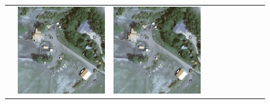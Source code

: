 \begin{figure}[H]
\begin{tabularx}{\textwidth}{c|*{9}{X}}
    & \includegraphics[trim={730pt 220pt 200pt 720pt},clip,width=\linewidth]{images/015Results/02perm_exp/comp_images/ground_truth/523.png}
    & \includegraphics[trim={850pt 110pt 80pt 830pt},clip,width=\linewidth]{images/015Results/02perm_exp/comp_images/ground_truth/523.png}

\end{tabularx}
\end{figure}
